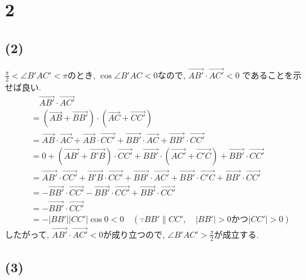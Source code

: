 \documentclass[a4j, 11pt]{jarticle}
\begin{document}
\section*{2}
\subsection*{(2)}
$\frac{\pi}{2} < \angle B'AC' < \pi$のとき, $\cos \angle B'AC < 0$なので,
$\overrightarrow{AB'} \cdot \overrightarrow{AC'} < 0$
であることを示せば良い.
\begin{align*}
	&\quad \overrightarrow{AB'} \cdot \overrightarrow{AC'} \\
	&= (\overrightarrow{AB} + \overrightarrow{BB'}) \cdot
	(\overrightarrow{AC} + \overrightarrow{CC'}) \\
	&= \overrightarrow{AB} \cdot \overrightarrow{AC}
	+ \overrightarrow{AB} \cdot \overrightarrow{CC'}
	+ \overrightarrow{BB'} \cdot \overrightarrow{AC}
	+ \overrightarrow{BB'} \cdot \overrightarrow{CC'} \\
	&= 0 + (\overrightarrow{AB'} + \overrightarrow{B'B}) \cdot
	\overrightarrow{CC'} + \overrightarrow{BB'} \cdot
	(\overrightarrow{AC'} + \overrightarrow{C'C})
	+ \overrightarrow{BB'} \cdot \overrightarrow{CC'} \\
	&= \overrightarrow{AB'} \cdot \overrightarrow{CC'}
	+ \overrightarrow{B'B} \cdot \overrightarrow{CC'}
	+ \overrightarrow{BB'} \cdot \overrightarrow{AC'}
	+ \overrightarrow{BB'} \cdot \overrightarrow{C'C}
	+ \overrightarrow{BB'} \cdot \overrightarrow{CC'} \\
	&= - \overrightarrow{BB'} \cdot \overrightarrow{CC'}
	- \overrightarrow{BB'} \cdot \overrightarrow{CC'}
	+ \overrightarrow{BB'} \cdot \overrightarrow{CC'} \\
	&= - \overrightarrow{BB'} \cdot \overrightarrow{CC'} \\
	&= - |BB'| |CC'| \cos 0 < 0
	\quad (\because BB' \parallel CC', 
	\quad |BB'| > 0 \text{かつ} |CC'| > 0)
\end{align*}
したがって, 
$\overrightarrow{AB'} \cdot \overrightarrow{AC'} < 0$が成り立つので, 
$\angle B'AC' > \frac{\pi}{2}$が成立する.
\subsection*{(3)}
\end{document}
